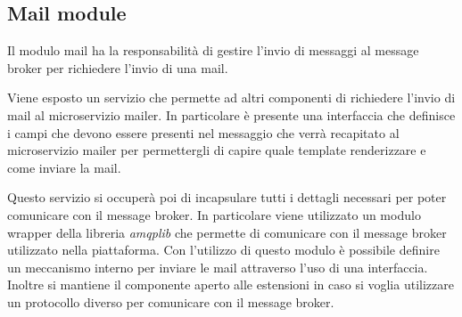\subsection{Mail module}
Il modulo mail ha la responsabilità di gestire l'invio di messaggi al message broker per richiedere
l'invio di una mail.

Viene esposto un servizio che permette ad altri componenti di richiedere l'invio di mail al microservizio mailer.
In particolare è presente una interfaccia che definisce i campi che devono essere presenti
nel messaggio che verrà recapitato al microservizio mailer per permettergli di capire quale
template renderizzare e come inviare la mail.

Questo servizio si occuperà poi di incapsulare tutti i dettagli necessari per poter comunicare con il
message broker. In particolare viene utilizzato un modulo wrapper della libreria \textit{amqplib} che permette di comunicare
con il message broker utilizzato nella piattaforma.
Con l'utilizzo di questo modulo è possibile definire un meccanismo interno per inviare le mail
attraverso l'uso di una interfaccia. Inoltre si mantiene il componente aperto alle estensioni
in caso si voglia utilizzare un protocollo diverso per comunicare con il message broker.